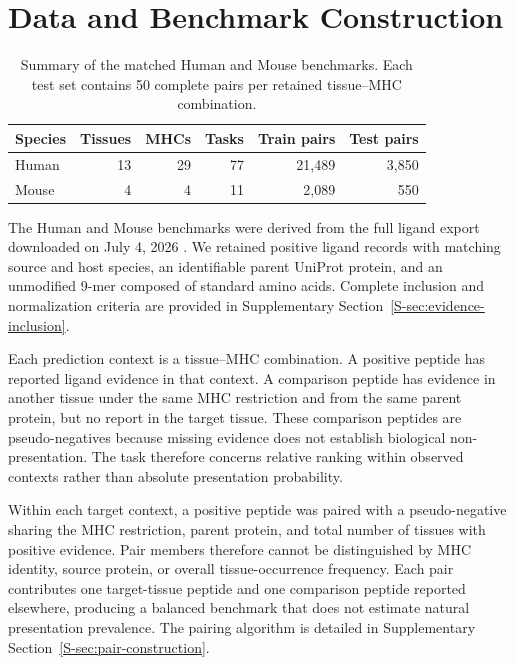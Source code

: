 \section{Data and Benchmark Construction}
\label{sec:data-benchmark}

\begin{table}[!t]
\centering
\caption{Summary of the matched Human and Mouse benchmarks. Each test set contains 50 complete pairs per retained tissue--MHC combination.}
\label{tab:benchmark-summary}
\small
\begin{tabularx}{\columnwidth}{@{}>{\raggedright\arraybackslash}Xrrrrr@{}}
\toprule
Species & Tissues & MHCs & Tasks & Train pairs & Test pairs \\
\midrule
Human & 13 & 29 & 77 & 21,489 & 3,850 \\
Mouse & 4 & 4 & 11 & 2,089 & 550 \\
\bottomrule
\end{tabularx}
\end{table}

The Human and Mouse benchmarks were derived from the full \plainIEDB{} ligand export downloaded on July 4, 2026 \cite{vita2025iedb}. We retained positive \plainMHCI{} ligand records with matching source and host species, an identifiable parent UniProt protein, and an unmodified 9-mer composed of standard amino acids. Complete inclusion and normalization criteria are provided in Supplementary Section~\ref{S-sec:evidence-inclusion}.

Each prediction context is a tissue--MHC combination. A positive peptide has reported ligand evidence in that context. A comparison peptide has evidence in another tissue under the same MHC restriction and from the same parent protein, but no report in the target tissue. These comparison peptides are pseudo-negatives because missing evidence does not establish biological non-presentation. The task therefore concerns relative ranking within observed contexts rather than absolute presentation probability.

Within each target context, a positive peptide was paired with a pseudo-negative sharing the MHC restriction, parent protein, and total number of tissues with positive evidence. Pair members therefore cannot be distinguished by MHC identity, source protein, or overall tissue-occurrence frequency. Each pair contributes one target-tissue peptide and one comparison peptide reported elsewhere, producing a balanced benchmark that does not estimate natural presentation prevalence. The pairing algorithm is detailed in Supplementary Section~\ref{S-sec:pair-construction}.

